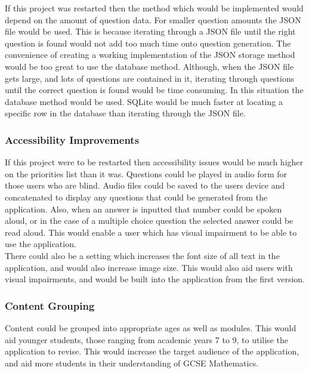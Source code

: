 \documentclass{article}
\begin{document}
If this project was restarted then the method which would be implemented would depend on the amount of question data. For smaller question amounts the JSON file would be used. This is because iterating through a JSON file until the right question is found would not add too much time onto question generation. The convenience of creating a working implementation of the JSON storage method would be too great to use the database method. Although, when the JSON file gets large, and lots of questions are contained in it, iterating through questions until the correct question is found would be time consuming. In this situation the database method would be used. SQLite would be much faster at locating a specific row in the database than iterating through the JSON file. \\

\subsubsection{Accessibility Improvements}

If this project were to be restarted then accessibility issues would be much higher on the priorities list than it was. Questions could be played in audio form for those users who are blind. Audio files could be saved to the users device and concatenated to display any questions that could be generated from the application. Also, when an answer is inputted that number could be spoken aloud, or in the case of a multiple choice question the selected answer could be read aloud. This would enable a user which has visual impairment to be able to use the application. \\

There could also be a setting which increases the font size of all text in the application, and would also increase image size. This would also aid users with visual impairments, and would be built into the application from the first version. \\

\subsubsection{Content Grouping}

Content could be grouped into appropriate ages as well as modules. This would aid younger students, those ranging from academic years 7 to 9, to utilise the application to revise. This would increase the target audience of the application, and aid more students in their understanding of GCSE Mathematics. \\
\end{document}
